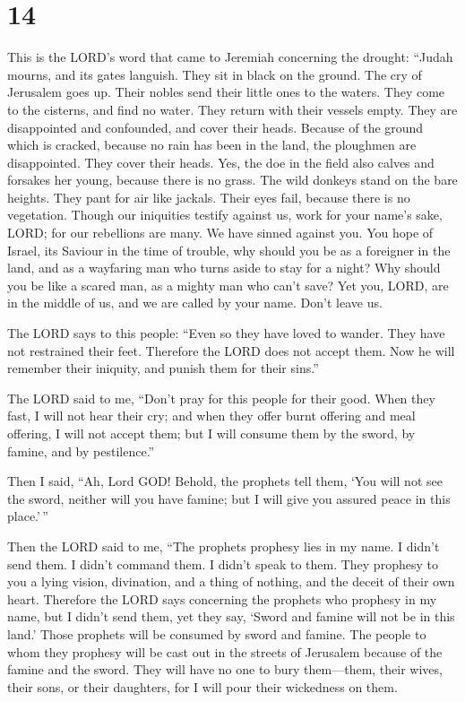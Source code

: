 \hypertarget{section-13}{%
\section{14}\label{section-13}}

 This is the LORD's word that came to Jeremiah concerning
the drought:  ``Judah mourns, and its gates languish. They
sit in black on the ground. The cry of Jerusalem goes up. 
Their nobles send their little ones to the waters. They come to the
cisterns, and find no water. They return with their vessels empty. They
are disappointed and confounded, and cover their heads. 
Because of the ground which is cracked, because no rain has been in the
land, the ploughmen are disappointed. They cover their heads.
 Yes, the doe in the field also calves and forsakes her
young, because there is no grass.  The wild donkeys stand
on the bare heights. They pant for air like jackals. Their eyes fail,
because there is no vegetation.  Though our iniquities
testify against us, work for your name's sake, LORD; for our rebellions
are many. We have sinned against you.  You hope of Israel,
its Saviour in the time of trouble, why should you be as a foreigner in
the land, and as a wayfaring man who turns aside to stay for a night?
 Why should you be like a scared man, as a mighty man who
can't save? Yet you, LORD, are in the middle of us, and we are called by
your name. Don't leave us.

 The LORD says to this people: ``Even so they have loved
to wander. They have not restrained their feet. Therefore the LORD does
not accept them. Now he will remember their iniquity, and punish them
for their sins.''

 The LORD said to me, ``Don't pray for this people for
their good.  When they fast, I will not hear their cry;
and when they offer burnt offering and meal offering, I will not accept
them; but I will consume them by the sword, by famine, and by
pestilence.''

 Then I said, ``Ah, Lord GOD! Behold, the prophets tell
them, `You will not see the sword, neither will you have famine; but I
will give you assured peace in this place.'\,''

 Then the LORD said to me, ``The prophets prophesy lies
in my name. I didn't send them. I didn't command them. I didn't speak to
them. They prophesy to you a lying vision, divination, and a thing of
nothing, and the deceit of their own heart.  Therefore
the LORD says concerning the prophets who prophesy in my name, but I
didn't send them, yet they say, `Sword and famine will not be in this
land.' Those prophets will be consumed by sword and famine.
 The people to whom they prophesy will be cast out in the
streets of Jerusalem because of the famine and the sword. They will have
no one to bury them---them, their wives, their sons, or their daughters,
for I will pour their wickedness on them.

